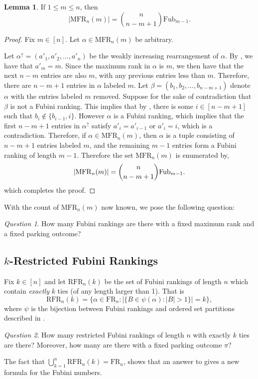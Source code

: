 \documentclass{amsart}
\theoremstyle{definition}
\newtheorem{lemma}{Lemma}[section]
\theoremstyle{definition}
\theoremstyle{remark}
\newtheorem{question}{Question}[section]
\newcommand{\MFR}{\mathrm{MFR}}
\newcommand{\RFR}{\mathrm{RFR}}
\newcommand{\Fub}{\mathrm{Fub}}
\newcommand{\FR}[1]{\mathrm{FR}_{#1}}
\begin{document}
\begin{lemma}
    If $1\leq m \leq n$, then 
    \begin{equation}
        |\MFR_n(m)| = \binom{n}{n-m+1}\Fub_{m-1}.
    \end{equation}
\end{lemma}
\begin{proof}
    Fix $m \in [n]$. Let $\alpha\in\MFR_n(m)$ be arbitrary. 
    
    Let $\alpha^{\uparrow} = (a'_1, a'_2, \ldots, a'_n)$ be the weakly increasing rearrangement of $\alpha$. By , we have that $a'_m = m$. Since the maximum rank in $\alpha$ is $m$, we then have that the next $n-m$ entries are also $m$, with any previous entries less than $m$. Therefore, there are $n-m+1$ entries in $\alpha$ labeled $m$.
    Let $\beta=(b_1,b_2,\ldots,b_{n-m+1})$ denote $\alpha$ with the entries labeled $m$ removed. Suppose for the sake of contradiction that $\beta$ is not a Fubini ranking. This implies that by , there is some $i\in[n-m+1]$ such that
    $b_i \notin \{b_{i-1}, i\}$. However $\alpha$ is a Fubini ranking, which implies that the first $n-m+1$ entries in $\alpha^\uparrow$ satisfy $a'_i=a'_{i-1}$ or $a'_i=i$, which is a contradiction. Therefore, if $\alpha\in\MFR_n(m)$, then $\alpha$ is a tuple consisting of $n-m+1$ entries labeled $m$, and the remaining $m-1$ entries form a Fubini ranking of length $m-1$. Therefore the set $\MFR_n(m)$ is enumerated by,
    \begin{equation}
        |\MFR_n(m)|=\binom{n}{n-m+1}\Fub_{m-1}.\qedhere
    \end{equation}
    which completes the proof.
\end{proof}
With the count of $\MFR_n(m)$ now known, we pose the following question:
\begin{question}
    How many Fubini rankings are there with a fixed maximum rank and a fixed parking outcome?
\end{question}

\subsection{$k$-Restricted Fubini Rankings} Fix $k \in [n]$ and let $\RFR_n(k)$ be the set of Fubini rankings of length $n$ which contain \textit{exactly} $k$ ties (of any length larger than 1). That is 
\[\RFR_n(k) = \{\alpha \in \FR{n} : |\{B \in \psi(\alpha) : |B| > 1\}| = k\},\]
where $\psi$ is the bijection between Fubini rankings and ordered set partitions described in . 

\begin{question}\label{question:restricted fubs}
    How many restricted Fubini rankings of length $n$ with exactly $k$ ties are there? Moreover, how many are there with a fixed parking outcome $\pi$?
\end{question}
The fact that $\bigcup_{k=1}^{n} \RFR_n(k) = \FR{n}$, shows that an answer to  gives a new formula for the Fubini numbers. 



\end{document}
